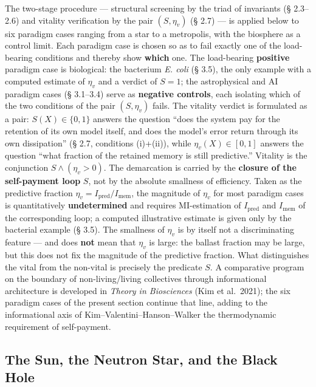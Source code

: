 \documentclass[pdflatex,sn-mathphys-ay]{sn-jnl}
\begin{document}
The two-stage procedure --- structural screening by the triad of invariants (§ 2.3--2.6) and vitality verification by the pair \((S, \eta_v)\) (§ 2.7) --- is applied below to six paradigm cases ranging from a star to a metropolis, with the biosphere as a control limit. Each paradigm case is chosen so as to fail exactly one of the load-bearing conditions and thereby show \textbf{which} one. The load-bearing \textbf{positive} paradigm case is biological: the bacterium \emph{E. coli} (§ 3.5), the only example with a computed estimate of \(\eta_v\) and a verdict of \(S = 1\); the astrophysical and AI paradigm cases (§ 3.1--3.4) serve as \textbf{negative controls}, each isolating which of the two conditions of the pair \((S, \eta_v)\) fails. The vitality verdict is formulated as a pair: \(S(X) \in \{0, 1\}\) answers the question ``does the system pay for the retention of its own model itself, and does the model's error return through its own dissipation'' (§ 2.7, conditions (i)+(ii)), while \(\eta_v(X) \in [0, 1]\) answers the question ``what fraction of the retained memory is still predictive.'' Vitality is the conjunction \(S \wedge (\eta_v > 0)\). The demarcation is carried by the \textbf{closure of the self-payment loop} \(S\), not by the absolute smallness of efficiency. Taken as the predictive fraction \(\eta_v = I_{\text{pred}}/I_{\text{mem}}\), the magnitude of \(\eta_v\) for most paradigm cases is quantitatively \textbf{undetermined} and requires MI-estimation of \(I_{\text{pred}}\) and \(I_{\text{mem}}\) of the corresponding loop; a computed illustrative estimate is given only by the bacterial example (§ 3.5). The smallness of \(\eta_v\) is by itself not a discriminating feature --- and does \textbf{not} mean that \(\eta_v\) is large: the ballast fraction may be large, but this does not fix the magnitude of the predictive fraction. What distinguishes the vital from the non-vital is precisely the predicate \(S\). A comparative program on the boundary of non-living/living collectives through informational architecture is developed in \emph{Theory in Biosciences} (Kim et al.~2021); the six paradigm cases of the present section continue that line, adding to the informational axis of Kim--Valentini--Hanson--Walker the thermodynamic requirement of self-payment.

\subsection{The Sun, the Neutron Star, and the Black Hole}\label{the-sun-the-neutron-star-and-the-black-hole}
\end{document}
